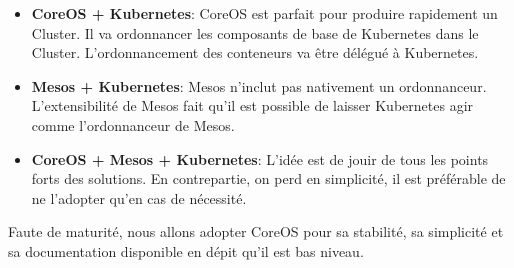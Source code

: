 \begin{itemize}
	\item \textbf{CoreOS + Kubernetes}: CoreOS est parfait pour produire rapidement un Cluster. Il va ordonnancer les composants de base de Kubernetes dans le Cluster. L'ordonnancement des conteneurs va être délégué à Kubernetes.
	\item \textbf{Mesos + Kubernetes}: Mesos n'inclut pas nativement un ordonnanceur. L'extensibilité de Mesos fait qu'il est possible de laisser Kubernetes agir comme l'ordonnanceur de Mesos.
	\item \textbf{CoreOS + Mesos + Kubernetes}: L'idée est de jouir de tous les points forts des solutions. En contrepartie, on perd en simplicité, il est préférable de ne l'adopter qu'en cas de nécessité.
\end{itemize}

Faute de maturité, nous allons adopter CoreOS pour sa stabilité, sa simplicité et sa documentation disponible en dépit qu'il est bas niveau.